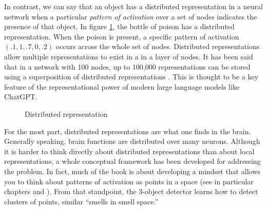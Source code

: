 In contrast, we can say that an object has a distributed representation in a neural network when a particular {\em pattern of activation} over a set of nodes indicates the presence of that object. In figure \ref{distributed},  the bottle of poison has a distributed representation. When the poison is present, a specific pattern of activation $(.1,1,.7,0,.2)$ occurs across the whole set of nodes.   Distributed representations allow multiple representations to exist in a  in a layer of nodes.  It has been said that in a network with 100 nodes, up to 100,000 representations can be stored using a superposition of distributed representations \cite{beckmann2025mechanistic}. This is thought to be a key feature of the representational power of modern large language models like ChatGPT.

\begin{figure}[h]
\centering
{}
\caption{Distributed representation}
\label{distributed}
\end{figure}

For the most part, distributed representations are what one finds in the brain. Generally speaking, brain functions are distributed over many neurons. Although it is harder to think directly about distributed representations than about local representations, a whole conceptual framework has been developed for addressing the problem. In fact, much of the book is about developing a mindset that allows you to think about patterns of activation as points in a space (see in particular chapters  and ).  From that standpoint, the 3-object detector learns how to detect clusters of points, similar ``smells in smell space.'' 
